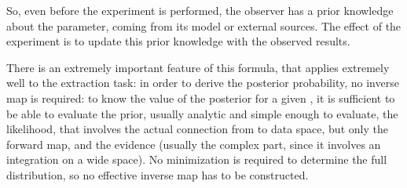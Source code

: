 So, even before the experiment is performed, the observer has a prior knowledge
about the parameter, coming from its model or external sources.
%
The effect of the experiment is to update this prior knowledge with the
observed results.

There is an extremely important feature of this formula, that applies extremely
well to the \pdfs extraction task: in order to derive the posterior
probability, no inverse map is required: to know the value of the posterior for
a given \pdf, it is sufficient to be able to evaluate the prior, usually
analytic and simple enough to evaluate, the likelihood, that involves the
actual connection from \pdfs to data space, but only the forward map, and the
evidence (usually the complex part, since it involves an integration on a wide
space).
%
No minimization is required to determine the full distribution, so no effective
inverse map has to be constructed.

